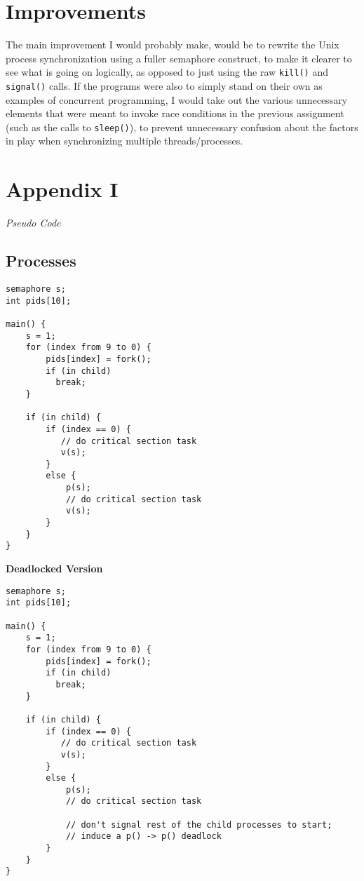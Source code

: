 \documentclass[12pt]{article}
\newcommand {\filename}[1] {\flushleft \textbf{#1}}
\newcommand {\append}[2] {\section*{Appendix #1} \textsl{\large #2}}
\begin{document}
\section*{Improvements}
The main improvement I would probably make, would be to rewrite the Unix process synchronization using a fuller semaphore construct, to make it 
clearer to see what is going on logically, as opposed to just using the raw \texttt{kill()} and \texttt{signal()} calls. If the programs were also
to simply stand on their own as examples of concurrent programming, I would take out the various unnecessary elements that were meant to invoke
race conditions in the previous assignment (such as the calls to \texttt{sleep()}), to prevent unnecessary confusion about the factors in play
when synchronizing multiple threads/processes.

\newpage
\append{I} {Pseudo Code}

\subsection*{Processes}

\begin{scriptsize}
\begin{verbatim}
semaphore s;
int pids[10];

main() {
    s = 1;
    for (index from 9 to 0) {
        pids[index] = fork();
        if (in child)
          break;
    }

    if (in child) {
        if (index == 0) {
           // do critical section task
           v(s);
        }
        else {
            p(s);
            // do critical section task
            v(s);
        }
    }
}
\end{verbatim}
\end{scriptsize}

\filename{Deadlocked Version}
\begin{scriptsize}
\begin{verbatim}
semaphore s;
int pids[10];

main() {
    s = 1;
    for (index from 9 to 0) {
        pids[index] = fork();
        if (in child)
          break;
    }

    if (in child) {
        if (index == 0) {
           // do critical section task
           v(s);
        }
        else {
            p(s);
            // do critical section task
            
            // don't signal rest of the child processes to start;
            // induce a p() -> p() deadlock
        }
    }
}
\end{verbatim}
\end{scriptsize}
\end{document}
